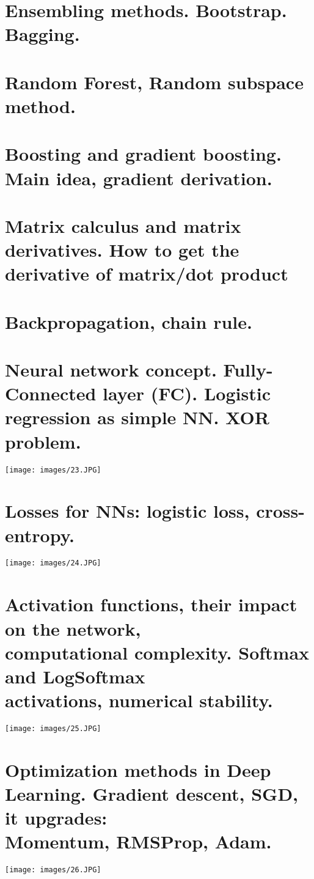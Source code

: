 \section{Ensembling methods. Bootstrap. Bagging.}


\section{Random Forest, Random subspace method.}


\section{Boosting and gradient boosting. Main idea, gradient derivation.}


\section{Matrix calculus and matrix derivatives. How to get the derivative of matrix/dot product}

\section{Backpropagation, chain rule.}

\section{Neural network concept. Fully-Connected layer (FC). Logistic regression as simple NN. XOR problem.}
\texttt{[image: images/23.JPG]}
\newpage

\section{Losses for NNs: logistic loss, cross-entropy.}
\texttt{[image: images/24.JPG]}
\newpage

\section{Activation functions, their impact on the network, \\ computational complexity. Softmax and LogSoftmax \\ activations, numerical stability.}
\texttt{[image: images/25.JPG]}
\newpage

\section{Optimization methods in Deep Learning. Gradient descent, SGD, it upgrades: \\ Momentum, RMSProp, Adam.}
\texttt{[image: images/26.JPG]}
\newpage

